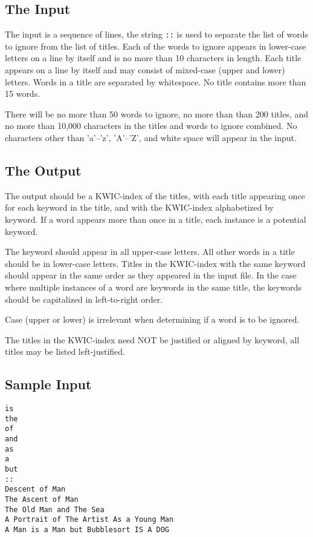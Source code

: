 \subsection*{The Input}
The input is a sequence of lines, the string \verb!::! is used to
separate the list of words to ignore from the list of titles.  Each of
the words to ignore appears in lower-case letters on a line by itself
and is no more than 10 characters in length.  Each title appears on a
line by itself and may consist of mixed-case (upper and lower) letters.
Words in a title are separated by whitespace.  No title contains more
than 15 words.

There will be no more than 50 words to ignore, no more than than 200
titles, and no more than 10,000 characters in the titles and words to
ignore combined.  No characters other than 'a'--'z', 'A'--'Z', and white
space will appear in the input.

\subsection*{The Output}

The output should be a KWIC-index of the titles, with each title
appearing once for each keyword in the title, and with the KWIC-index
alphabetized by keyword.  If a word appears more than once in a title,
each instance is a potential keyword.  

The keyword should appear in all upper-case
letters. All other words in a title should be in lower-case letters.
Titles in the KWIC-index with the same keyword should appear in the same
order as they appeared in the input file.  In the case where multiple
instances of a word are keywords in the same title, the keywords should
be capitalized in left-to-right order.

Case (upper or lower) is irrelevant when determining if a word is to be
ignored. 

The titles in the KWIC-index need NOT be justified or aligned by
keyword, all titles may be listed left-justified.

\subsection*{Sample Input}
\begin{verbatim}
is
the
of
and
as
a
but
::
Descent of Man
The Ascent of Man
The Old Man and The Sea
A Portrait of The Artist As a Young Man
A Man is a Man but Bubblesort IS A DOG
\end{verbatim}


